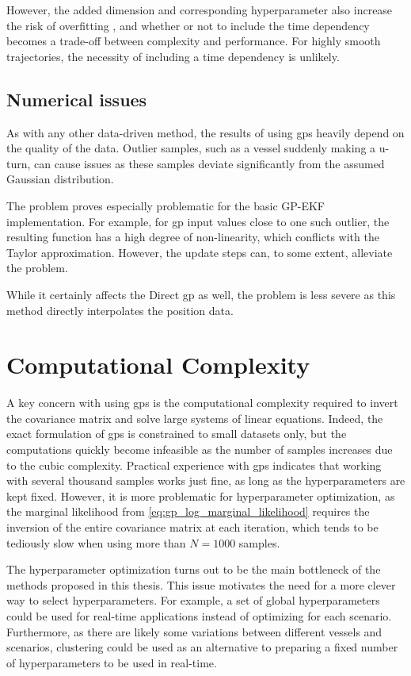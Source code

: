 However, the added dimension and corresponding hyperparameter also increase the risk of overfitting \cite{rasmussen}, and whether or not to include the time dependency becomes a trade-off between complexity and performance. For highly smooth trajectories, the necessity of including a time dependency is unlikely. 

\subsection{Numerical issues}
As with any other data-driven method, the results of using \acrshort{gp}s heavily depend on the quality of the data. Outlier samples, such as a vessel suddenly making a u-turn, can cause issues as these samples deviate significantly from the assumed Gaussian distribution.

The problem proves especially problematic for the basic GP-EKF implementation. For example, for \acrshort{gp} input values close to one such outlier, the resulting function has a high degree of non-linearity, which conflicts with the Taylor approximation. However, the update steps can, to some extent, alleviate the problem. 

While it certainly affects the Direct \acrshort{gp} as well, the problem is less severe as this method directly interpolates the position data.  

\section{Computational Complexity}
A key concern with using \acrshort{gp}s is the computational complexity required to invert the covariance matrix and solve large systems of linear equations. Indeed, the exact formulation of \acrshort{gp}s is constrained to small datasets only, but the computations quickly become infeasible as the number of samples increases due to the cubic complexity. Practical experience with \acrshort{gp}s indicates that working with several thousand samples works just fine, as long as the hyperparameters are kept fixed. However, it is more problematic for hyperparameter optimization, as the marginal likelihood from \cref{eq:gp_log_marginal_likelihood} requires the inversion of the entire covariance matrix at each iteration, which tends to be tediously slow when using more than $N=1000$ samples. 

The hyperparameter optimization turns out to be the main bottleneck of the methods proposed in this thesis. This issue motivates the need for a more clever way to select hyperparameters. For example, a set of global hyperparameters could be used for real-time applications instead of optimizing for each scenario. Furthermore, as there are likely some variations between different vessels and scenarios, clustering could be used as an alternative to preparing a fixed number of hyperparameters to be used in real-time.

